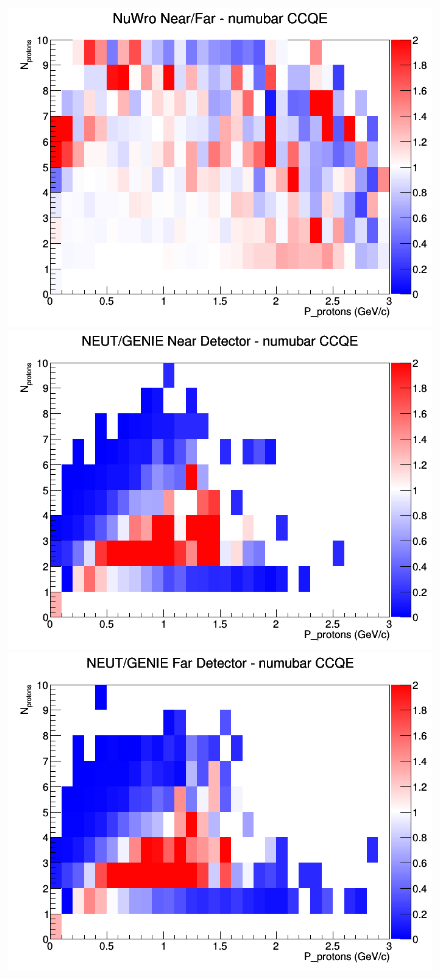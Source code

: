 \begin{figure}[h]
\endminipage
{}
\includegraphics[width=\linewidth]{N_P/nominal/protons/ratios/CCQE_NuWro_numubar_NF_N_P.png}
\endminipage
\newline
{}
\includegraphics[width=\linewidth]{N_P/nominal/protons/ratios/CCQE_NEUT_GENIE_numubar_near_N_P.png}
\endminipage
{}
\includegraphics[width=\linewidth]{N_P/nominal/protons/ratios/CCQE_NEUT_GENIE_numubar_far_N_P.png}

\end{figure}
